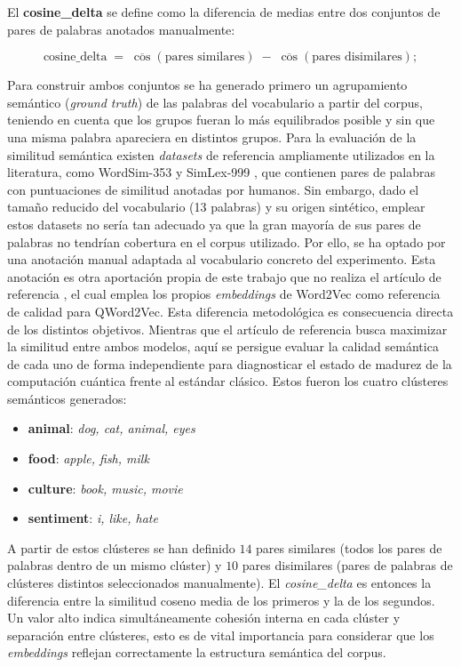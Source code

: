 El \textbf{cosine\_delta} se define como la diferencia de medias entre dos conjuntos de pares de palabras anotados manualmente:

\begin{equation*}
  \text{cosine\_delta} \;=\; \overline{\cos}(\text{pares similares}) \;-\; \overline{\cos}(\text{pares disimilares});
\end{equation*}

Para construir ambos conjuntos se ha generado primero un agrupamiento semántico (\textit{ground truth}) de las palabras del vocabulario a partir del corpus, teniendo en cuenta que los grupos fueran lo más equilibrados posible y sin que una misma palabra apareciera en distintos grupos. Para la evaluación de la similitud semántica existen \textit{datasets} de referencia ampliamente utilizados en la literatura, como WordSim-353 \cite{wordsim353_kaggle} y SimLex-999 \cite{simlex999_hill_2015}, que contienen pares de palabras con puntuaciones de similitud anotadas por humanos. Sin embargo, dado el tamaño reducido del vocabulario (13 palabras) y su origen sintético, emplear estos datasets no sería tan adecuado ya que la gran mayoría de sus pares de palabras no tendrían cobertura en el corpus utilizado. Por ello, se ha optado por una anotación manual adaptada al vocabulario concreto del experimento. Esta anotación es otra aportación propia de este trabajo que no realiza el artículo de referencia \cite{ohno_qword2vec_2025}, el cual emplea los propios \textit{embeddings} de Word2Vec como referencia de calidad para QWord2Vec. Esta diferencia metodológica es consecuencia directa de los distintos objetivos. Mientras que el artículo de referencia busca maximizar la similitud entre ambos modelos, aquí se persigue evaluar la calidad semántica de cada uno de forma independiente para diagnosticar el estado de madurez de la computación cuántica frente al estándar clásico. Estos fueron los cuatro clústeres semánticos generados:

\begin{itemize}
  \item \textbf{animal}: \textit{dog, cat, animal, eyes}
  \item \textbf{food}: \textit{apple, fish, milk}
  \item \textbf{culture}: \textit{book, music, movie}
  \item \textbf{sentiment}: \textit{i, like, hate}
\end{itemize}

A partir de estos clústeres se han definido $14$ pares similares (todos los pares de palabras dentro de un mismo clúster) y $10$ pares disimilares (pares de palabras de clústeres distintos seleccionados manualmente). El \textit{cosine\_delta} es entonces la diferencia entre la similitud coseno media de los primeros y la de los segundos. Un valor alto indica simultáneamente cohesión interna en cada clúster y separación entre clústeres, esto es de vital importancia para considerar que los \textit{embeddings} reflejan correctamente la estructura semántica del corpus.

